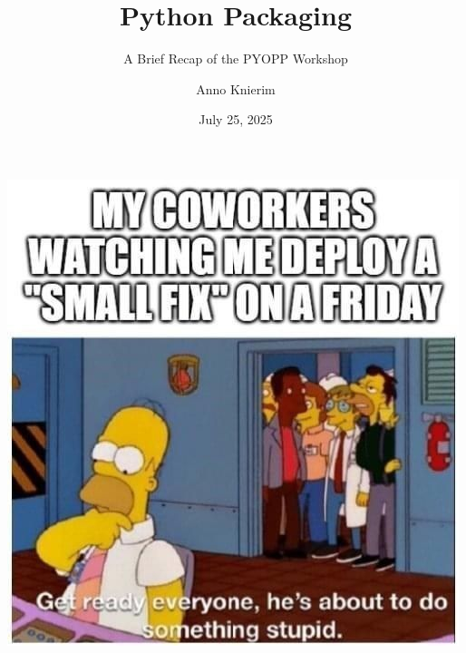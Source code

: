\documentclass[aspectratio=1610, 9pt]{beamer}
\title{Python Packaging}
\subtitle{A Brief Recap of the PYOPP Workshop}
\author[A.~Knierim]{Anno Knierim}
\date{July 25, 2025}
\begin{document}
\maketitle









\begin{frame}
  \begin{center}
    \includegraphics[height=0.75\textheight]{graphics/homer.jpg}
  \end{center}
\end{frame}
\end{document}
